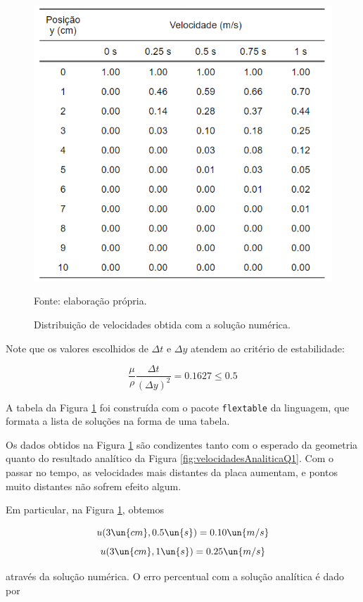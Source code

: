 \begin{figure}[h!]
    \caption{Distribuição de velocidades obtida com a solução numérica.}
    \label{fig:tabelaNumericaQ1}
    \centering
    \centerline{\includegraphics[scale=0.75]{tabelaNumericaQ1.png}}
    \par{Fonte: elaboração própria.}
\end{figure}

Note que os valores escolhidos de $\Delta t$ e $\Delta y$ atendem ao critério de estabilidade:

\[ \frac{\mu}{\rho} \frac{\Delta t}{\left(\Delta y\right)^2} = 0.1627 \leq 0.5 \]

A tabela da Figura \ref*{fig:tabelaNumericaQ1} foi construída com o pacote  \verb|flextable| da linguagem,
que formata a lista de soluções na forma de uma tabela.  

Os dados obtidos na Figura \ref*{fig:tabelaNumericaQ1} são condizentes tanto com o esperado da geometria
quanto do resultado analítico da Figura \eqref{fig:velocidadesAnaliticaQ1}. Com o passar no tempo,
as velocidades mais distantes da placa aumentam, e pontos muito distantes não sofrem efeito 
algum.

Em particular, na Figura \ref*{fig:tabelaNumericaQ1}, obtemos 

\[ u(3 \un{cm}, 0.5 \un{s}) = 0.10 \un{m/s} \]
\[ u(3 \un{cm}, 1 \un{s}) = 0.25 \un{m/s} \]

\noindent através da solução numérica. O erro percentual com a solução analítica é dado por 

